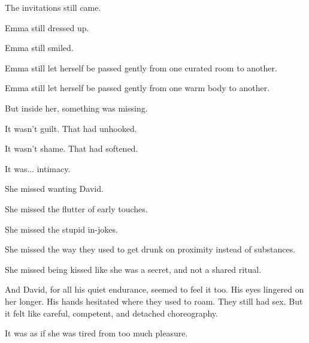 The invitations still came. 

Emma still dressed up. 

Emma still smiled. 

Emma still let herself be passed gently from one curated room to another.

Emma still let herself be passed gently from one warm body to another. 

But inside her, something was missing.

It wasn’t guilt. That had unhooked.

It wasn’t shame. That had softened.

It was... intimacy.

She missed wanting David. 

She missed the flutter of early touches. 

She missed the stupid in-jokes.

She missed the way they used to get drunk on proximity instead of substances. 

She missed being kissed like she was a secret, and not a shared ritual.

And David, for all his quiet endurance, seemed to feel it too. His eyes lingered on her longer. 
His hands hesitated where they used to roam. They still had sex. But it felt like careful,
competent, and detached choreography. 

It was as if she was tired from too much pleasure.

